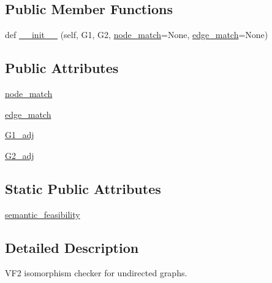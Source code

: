 \subsection*{Public Member Functions}
\begin{DoxyCompactItemize}
\item 
def \hyperlink{classnetworkx_1_1algorithms_1_1isomorphism_1_1vf2userfunc_1_1GraphMatcher_a961d057ce8c3c616c787b384c7c1ae77}{\+\_\+\+\_\+init\+\_\+\+\_\+} (self, G1, G2, \hyperlink{classnetworkx_1_1algorithms_1_1isomorphism_1_1vf2userfunc_1_1GraphMatcher_a6cac0eb9c46db6c80e0e2ce1ee33052e}{node\+\_\+match}=None, \hyperlink{classnetworkx_1_1algorithms_1_1isomorphism_1_1vf2userfunc_1_1GraphMatcher_a99cc8c319d252884c51f89fc5624edf1}{edge\+\_\+match}=None)
\end{DoxyCompactItemize}
\subsection*{Public Attributes}
\begin{DoxyCompactItemize}
\item 
\hyperlink{classnetworkx_1_1algorithms_1_1isomorphism_1_1vf2userfunc_1_1GraphMatcher_a6cac0eb9c46db6c80e0e2ce1ee33052e}{node\+\_\+match}
\item 
\hyperlink{classnetworkx_1_1algorithms_1_1isomorphism_1_1vf2userfunc_1_1GraphMatcher_a99cc8c319d252884c51f89fc5624edf1}{edge\+\_\+match}
\item 
\hyperlink{classnetworkx_1_1algorithms_1_1isomorphism_1_1vf2userfunc_1_1GraphMatcher_a607ebf960da736ed1ecbf7431390e716}{G1\+\_\+adj}
\item 
\hyperlink{classnetworkx_1_1algorithms_1_1isomorphism_1_1vf2userfunc_1_1GraphMatcher_a17dd27841d8362898c71210baf8b2f64}{G2\+\_\+adj}
\end{DoxyCompactItemize}
\subsection*{Static Public Attributes}
\begin{DoxyCompactItemize}
\item 
\hyperlink{classnetworkx_1_1algorithms_1_1isomorphism_1_1vf2userfunc_1_1GraphMatcher_a03c050b9deb96effc54c6b0a4f7ebf0f}{semantic\+\_\+feasibility}
\end{DoxyCompactItemize}


\subsection{Detailed Description}
\begin{DoxyVerb}VF2 isomorphism checker for undirected graphs.\end{DoxyVerb}
 

